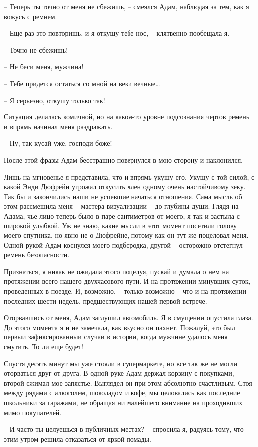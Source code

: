 \documentclass[
]{book}
\begin{document}
-- Теперь ты точно от меня не сбежишь, -- смеялся Адам, наблюдая за тем, как я вожусь с ремнем.

-- Еще раз это повторишь, и я откушу тебе нос, -- клятвенно пообещала я.

-- Точно не сбежишь!

-- Не беси меня, мужчина!

-- Тебе придется остаться со мной на веки вечные\ldots{}

-- Я серьезно, откушу только так!

Ситуация делалась комичной, но на каком-то уровне подсознания чертов ремень и впрямь начинал меня раздражать.

-- Ну, так кусай уже, господи боже!

После этой фразы Адам бесстрашно повернулся в мою сторону и наклонился.

Лишь на мгновенье я представила, что и впрямь укушу его. Укушу с той силой, с какой Энди Дюфрейн угрожал откусить член одному очень настойчивому зеку. Так бы и закончились наши не успевшие начаться отношения. Сама мысль об этом рассмешила меня -- мастера визуализации -- до глубины души. Глядя на Адама, чье лицо теперь было в паре сантиметров от моего, я так и застыла с широкой улыбкой. Уж не знаю, какие мысли в этот момент посетили голову моего спутника, но явно не о Дюфрейне, потому как он тут же поцеловал меня. Одной рукой Адам коснулся моего подбородка, другой -- осторожно отстегнул ремень безопасности.

Признаться, я никак не ожидала этого поцелуя, пускай и думала о нем на протяжении всего нашего двухчасового пути. И на протяжении минувших суток, проведенных в поезде. И, возможно, -- только возможно -- что и на протяжении последних шести недель, предшествующих нашей первой встрече.

Оторвавшись от меня, Адам заглушил автомобиль. Я в смущении опустила глаза. До этого момента я и не замечала, как вкусно он пахнет. Пожалуй, это был первый зафиксированный случай в истории, когда мужчине удалось меня смутить. То ли еще будет!

Спустя десять минут мы уже стояли в супермаркете, но все так же не могли оторваться друг от друга. В одной руке Адам держал корзину с покупками, второй сжимал мое запястье. Выглядел он при этом абсолютно счастливым. Стоя между рядами с алкоголем, шоколадом и кофе, мы целовались как последние школьники за гаражами, не обращая ни малейшего внимание на проходивших мимо покупателей.

-- И часто ты целуешься в публичных местах? -- спросила я, радуясь тому, что этим утром решила отказаться от яркой помады.
\end{document}
